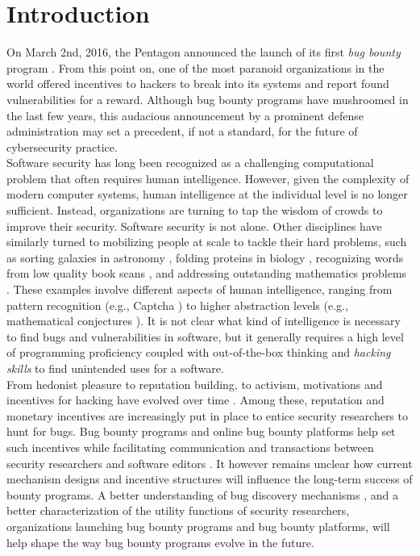 \section{Introduction}
\label{sec:intro}
On March 2nd, 2016, the Pentagon announced the launch of its first {\it bug bounty} program \cite{Pentagon}. From this point on, one of the most paranoid organizations in the world offered incentives to hackers to break into its systems and report found vulnerabilities for a reward. Although bug bounty programs have mushroomed in the last few years, this audacious announcement by a prominent defense administration may set a precedent, if not a standard, for the future of cybersecurity practice.\\ 

Software security has long been recognized as a challenging computational problem \cite{adams1984textordfeminineoptimizing} that often requires human intelligence. However, given the complexity of modern computer systems, human intelligence at the individual level is no longer sufficient. Instead, organizations are turning to tap the wisdom of crowds \cite{surowiecki2005wisdom} to improve their security. Software security is not alone. Other disciplines have similarly turned to mobilizing people at scale to tackle their hard problems, such as sorting galaxies in astronomy \cite{smith2013introduction}, folding proteins in biology \cite{khatib2011algorithm}, recognizing words from low quality book scans \cite{von2003captcha}, and addressing outstanding mathematics problems \cite{gowers2009massively,cranshaw2011polymath}. These examples involve different aspects of human intelligence, ranging from pattern recognition (e.g., Captcha \cite{von2003captcha}) to higher abstraction levels (e.g., mathematical conjectures \cite{gowers2009massively,cranshaw2011polymath}). It is not clear what kind of intelligence is necessary to find bugs and vulnerabilities in software, but it generally requires a high level of programming proficiency coupled with out-of-the-box thinking and {\it hacking skills} to find unintended uses for a software. \\

From hedonist pleasure to reputation building, to activism, motivations and incentives for hacking have evolved over time \cite{Levy84}. Among these, reputation and monetary incentives are increasingly put in place to entice security researchers to hunt for bugs. Bug bounty programs and online bug bounty platforms help set such incentives while facilitating communication and transactions between security researchers and software editors \cite{bohme2006comparison,finifter2013empirical,zhao2014exploratory,zhao2015empirical}. It however remains unclear how current mechanism designs and incentive structures will influence the long-term success of bounty programs. A better understanding of bug discovery mechanisms \cite{bishop1996conservative,brady1999murphy,zhao2016empirical}, and a better characterization of the utility functions of security researchers, organizations launching bug bounty programs and bug bounty platforms, will help shape the way bug bounty programs evolve in the future.\\

